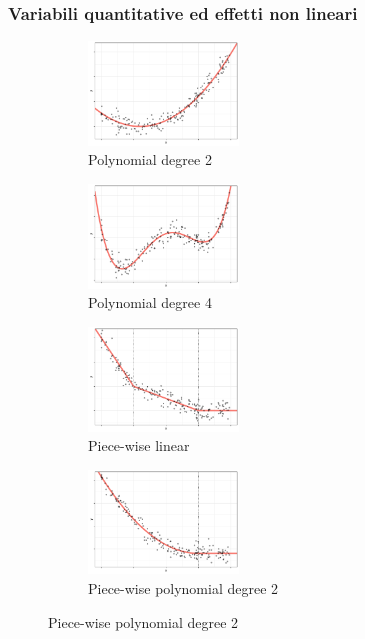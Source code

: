 \documentclass[pdf, aspectratio=169]{beamer}\usepackage[]{graphicx}\usepackage[]{color}
\theoremstyle{definition}
\begin{document}
\begin{frame}
\frametitle{Variabili quantitative ed effetti non lineari}

\fontsize{9pt}{11pt}\selectfont

\begin{figure}
  \centering
  \begin{subfigure}[b]{4.8cm}
    \centering
    \includegraphics[width=4cm]{_bookdown_files/_main_files/figure-latex/expl-var-quant-effect-1.pdf}
    \caption{Polynomial degree 2}
  \end{subfigure}
  \qquad
  \begin{subfigure}[b]{4.8cm}
    \centering
    \includegraphics[width=4cm]{_bookdown_files/_main_files/figure-latex/expl-var-quant-effect-2.pdf}
    \caption{Polynomial degree 4}
  \end{subfigure}
  \par\medskip
  \begin{subfigure}[b]{4.8cm}
    \centering
    \includegraphics[width=4cm]{_bookdown_files/_main_files/figure-latex/expl-var-quant-effect-3.pdf}
    \caption{Piece-wise linear}
  \end{subfigure}
  \qquad
  \begin{subfigure}[b]{4.8cm}
    \centering
    \includegraphics[width=4cm]{_bookdown_files/_main_files/figure-latex/expl-var-quant-effect-4.pdf}
    \caption{Piece-wise polynomial degree 2}
  \end{subfigure}
\end{figure}

\end{frame}
\end{document}
